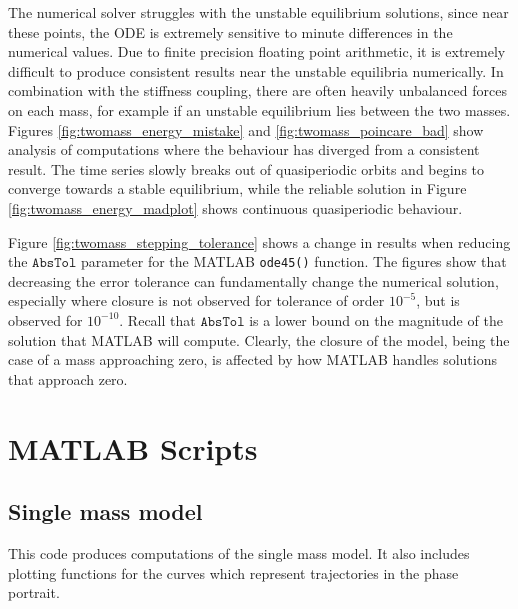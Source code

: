 \documentclass{report}
\begin{document}
The numerical solver struggles with the unstable equilibrium solutions,
since near these points, the ODE is extremely sensitive to minute differences in the numerical values.
Due to finite precision floating point arithmetic,
it is extremely difficult to produce consistent results near the unstable equilibria numerically.
In combination with the stiffness coupling, there are often heavily unbalanced forces on each mass,
for example if an unstable equilibrium lies between the two masses.
Figures \ref{fig:twomass_energy_mistake} and \ref{fig:twomass_poincare_bad} show analysis of computations where the behaviour has diverged from a consistent result.
The time series slowly breaks out of quasiperiodic orbits and begins to converge towards a stable equilibrium,
while the reliable solution in Figure \ref{fig:twomass_energy_madplot} shows continuous quasiperiodic behaviour.

Figure \ref{fig:twomass_stepping_tolerance} shows a change in results when reducing the $\mathtt{AbsTol}$ parameter for the MATLAB \texttt{ode45()} function.
The figures show that decreasing the error tolerance can fundamentally change the numerical solution,
especially where closure is not observed for tolerance of order $10^{-5}$,
but is observed for $10^{-10}$.
Recall that $\mathtt{AbsTol}$ is a lower bound on the magnitude of the solution that MATLAB will compute.
Clearly, the closure of the model, being the case of a mass approaching zero,
is affected by how MATLAB handles solutions that approach zero.

\chapter{MATLAB Scripts}

\section{Single mass model}

This code produces computations of the single mass model.
It also includes plotting functions for the curves which represent trajectories in the phase portrait.
\end{document}
